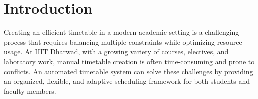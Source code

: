 \documentclass[12pt]{article}
\begin{document}
\newpage
\thispagestyle{empty}
\clearpage             %
\thispagestyle{empty}  %
\phantom{a}            %




\section{Introduction}
\large
Creating an efficient timetable in a modern academic setting is a challenging process that requires balancing multiple constraints while optimizing resource usage. At IIIT Dharwad, with a growing variety of courses, electives, and laboratory work, manual timetable creation is often time-consuming and prone to conflicts. An automated timetable system can solve these challenges by providing an organized, flexible, and adaptive scheduling framework for both students and faculty members.
\end{document}
